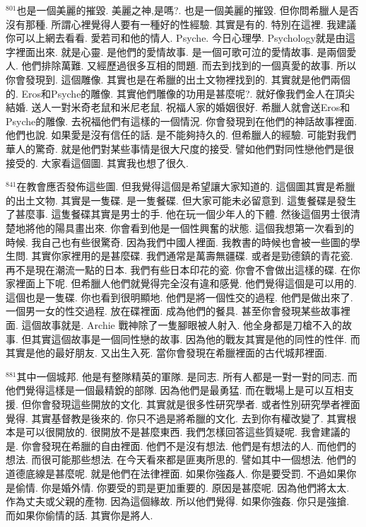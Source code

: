 \documentclass{book}
\begin{document}
$^{801}$也是一個美麗的摧毀.
美麗之神,是嗎?.
也是一個美麗的摧毀.
但你問希臘人是否沒有那種.
所謂心裡覺得人要有一種好的性經驗.
其實是有的.
特別在這裡.
我建議你可以上網去看看.
愛若司和他的情人.
Psyche.
今日心理學.
Psychology就是由這字裡面出來.
就是心靈.
是他們的愛情故事.
是一個可歌可泣的愛情故事.
是兩個愛人.
他們排除萬難.
又經歷過很多互相的問題.
而去到找到的一個真愛的故事.
所以你會發現到.
這個雕像.
其實也是在希臘的出土文物裡找到的.
其實就是他們兩個的.
Eros和Psyche的雕像.
其實他們雕像的功用是甚麼呢?.
就好像我們金人在頂尖結婚.
送人一對米奇老鼠和米尼老鼠.
祝福人家的婚姻很好.
希臘人就會送Eros和Psyche的雕像.
去祝福他們有這樣的一個情況.
你會發現到在他們的神話故事裡面.
他們也說.
如果愛是沒有信任的話.
是不能夠持久的.
但希臘人的經驗.
可能對我們華人的驚奇.
就是他們對某些事情是很大尺度的接受.
譬如他們對同性戀他們是很接受的.
大家看這個圖.
其實我也想了很久.

$^{841}$在教會應否發佈這些圖.
但我覺得這個是希望讓大家知道的.
這個圖其實是希臘的出土文物.
其實是一隻碟.
是一隻餐碟.
但大家可能未必留意到.
這隻餐碟是發生了甚麼事.
這隻餐碟其實是男士的手.
他在玩一個少年人的下體.
然後這個男士很清楚地將他的陽具畫出來.
你會看到他是一個性興奮的狀態.
這個我想第一次看到的時候.
我自己也有些很驚奇.
因為我們中國人裡面.
我教書的時候也會被一些圖的學生問.
其實你家裡用的是甚麼碟.
我們通常是萬壽無疆碟.
或者是勁德鎮的青花瓷.
再不是現在潮流一點的日本.
我們有些日本印花的瓷.
你會不會做出這樣的碟.
在你家裡面上下呢.
但希臘人他們就覺得完全沒有違和感覺.
他們覺得這個是可以用的.
這個也是一隻碟.
你也看到很明顯地.
他們是將一個性交的過程.
他們是做出來了.
一個男一女的性交過程.
放在碟裡面.
成為他們的餐具.
甚至你會發現某些故事裡面.
這個故事就是.
Archie 戰神除了一隻腳眼被人射入.
他全身都是刀槍不入的故事.
但其實這個故事是一個同性戀的故事.
因為他的戰友其實是他的同性的性伴.
而其實是他的最好朋友.
又出生入死.
當你會發現在希臘裡面的古代城邦裡面.

$^{881}$其中一個城邦.
他是有整隊精英的軍隊.
是同志.
所有人都是一對一對的同志.
而他們覺得這樣是一個最精銳的部隊.
因為他們是最勇猛.
而在戰場上是可以互相支援.
但你會發現這些開放的文化.
其實就是很多性研究學者.
或者性別研究學者裡面覺得.
其實基督教是後來的.
你只不過是將希臘的文化.
去到你有權改變了.
其實根本是可以很開放的.
很開放不是甚麼東西.
我們怎樣回答這些質疑呢.
我會建議的是.
你會發現在希臘的自由裡面.
他們不是沒有想法.
他們是有想法的人.
而他們的想法.
而很可能那些想法.
在今天看來都是匪夷所思的.
譬如其中一個想法.
他們的道德底線是甚麼呢.
就是他們在法律裡面.
如果你強姦人.
你是要受罰.
不過如果你是偷情.
你是婚外情.
你要受的罰是更加重要的.
原因是甚麼呢.
因為他們將太太.
作為丈夫或父親的產物.
因為這個緣故.
所以他們覺得.
如果你強姦.
你只是強搶.
而如果你偷情的話.
其實你是將人.
\end{document}
